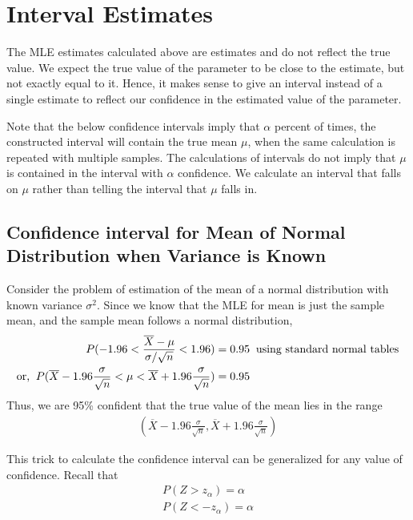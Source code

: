 \documentclass[../probability-notes.tex]{subfiles}
\begin{document}
    \section{Interval Estimates}
    The MLE estimates calculated above are estimates and do not reflect the true value. We expect the true value of the parameter to be close to the estimate, but not exactly equal to it. Hence, it makes sense to give an interval instead of a single estimate to reflect our confidence in the estimated value of the parameter.\newline

    Note that the below confidence intervals imply that $\alpha$ percent of times, the constructed interval will contain the true mean $\mu$, when the same calculation is repeated with multiple samples. The calculations of intervals do not imply that $\mu$ is contained in the interval with $\alpha$ confidence. We calculate an interval that falls on $\mu$ rather than telling the interval that $\mu$ falls in.\newline

    \subsection{Confidence interval for Mean of Normal Distribution when Variance is Known}
    Consider the problem of estimation of the mean of a normal distribution with known variance $\sigma^{2}$. Since we know that the MLE for mean is just the sample mean, and the sample mean follows a normal distribution,
    \begin{align*}
        P(-1.96 < \frac{\overline{X} - \mu}{\sigma / \sqrt{n}} < 1.96) &= 0.95 \text{\: using standard normal tables}\\
        \text{or, \:} P(\overline{X} - 1.96\frac{\sigma}{\sqrt{n}}< \mu < \overline{X} + 1.96\frac{\sigma}{\sqrt{n}}) &= 0.95
    \end{align*}
    Thus, we are 95\% confident that the true value of the mean lies in the range
    \begin{align*}
        (\overline{X} - 1.96\frac{\sigma}{\sqrt{n}}, \overline{X} + 1.96\frac{\sigma}{\sqrt{n}})
    \end{align*}

    This trick to calculate the confidence interval can be generalized for any value of confidence. Recall that
    \begin{align*}
        P(Z > z_{\alpha}) = \alpha\\
        P(Z < -z_{\alpha}) = \alpha
    \end{align*}
\end{document}
